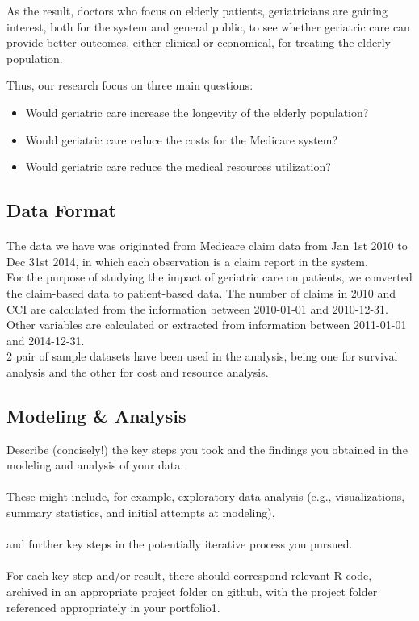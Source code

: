 \documentclass{article}
\begin{document}
	As the result, doctors who focus on elderly patients, geriatricians are gaining interest, both for the system and general public, to see whether geriatric care can provide better outcomes, either clinical or economical, for treating the elderly population. 
	
	Thus, our research focus on three main questions: 
	\begin{itemize}
		\item Would geriatric care increase the longevity of the elderly population? 
		\item Would geriatric care reduce the costs for the Medicare system?
		\item Would geriatric care reduce the medical resources utilization?
	\end{itemize}
	   	
	\subsection{Data Format}
	\paragraph{}The data we have was originated from Medicare claim data from Jan 1st 2010 to Dec 31st 2014, in which each observation is a claim report in the system. \\
	
    For the purpose of studying the impact of geriatric care on patients, we converted the claim-based data to patient-based data. The number of claims in 2010 and CCI are calculated from the information between 2010-01-01 and 2010-12-31. Other variables are calculated or extracted from information between 2011-01-01 and 2014-12-31. \\
    
    2 pair of sample datasets have been used in the analysis, being one for survival analysis and the other for cost and resource analysis.\\

	
	\subsection{Modeling \& Analysis}
	Describe (concisely!) the key steps you took and the findings you obtained in the modeling and analysis of your data.\\
	\\
	These might include, for example, exploratory data analysis (e.g., visualizations, summary statistics, and initial attempts at modeling),\\
	\\
	and further key steps in the potentially iterative process you pursued. \\
	\\
	For each key step and/or result, there should correspond relevant R code, archived in an appropriate project folder on github, with the project folder referenced appropriately in your portfolio1.
\end{document}
